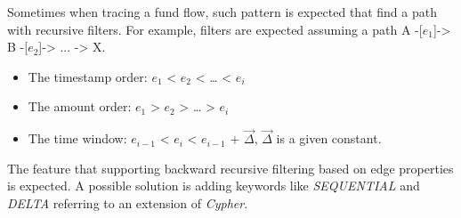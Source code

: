 
Sometimes when tracing a fund flow, such pattern is expected that find a path
with recursive filters. For example, filters are expected assuming a path A
-[${e_1}$]-> B -[${e_2}$]-> ... -> X.

\begin{itemize}
    \item The timestamp order: ${e_1}$ < ${e_2}$ < … < ${e_i}$
    \item The amount order: ${e_1}$ > ${e_2}$ > … > ${e_i}$
    \item The time window: ${e_{i-1}}$ < ${e_i}$ < ${e_{i-1}}$ + $\vec{\Delta}$,
    $\vec{\Delta}$ is a given constant.
\end{itemize}


The feature that supporting backward recursive filtering based on edge
properties is expected. A possible solution is adding keywords like
\emph{SEQUENTIAL} and \emph{DELTA} referring to an extension of
\emph{Cypher}\cite{tcypher}.


